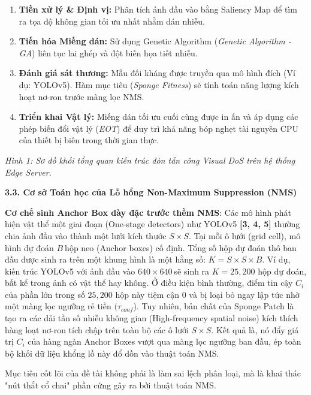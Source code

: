 \begin{enumerate}
\def\labelenumi{\arabic{enumi}.}
\item
  \textbf{Tiền xử lý \& Định vị:} Phân tích ảnh đầu vào bằng Saliency
  Map để tìm ra tọa độ không gian tối ưu nhất nhằm dán nhiễu.
\item
  \textbf{Tiến hóa Miếng dán:} Sử dụng Genetic Algorithm (\emph{Genetic
  Algorithm - GA}) liên tục lai ghép và đột biến họa tiết nhiễu.
\item
  \textbf{Đánh giá sát thương:} Mẫu đối kháng được truyền qua mô hình
  đích (Ví dụ: YOLOv5). Hàm mục tiêu (\emph{Sponge Fitness}) sẽ tính
  toán năng lượng kích hoạt nơ-ron trước màng lọc NMS.
\item
  \textbf{Triển khai Vật lý:} Miếng dán tối ưu cuối cùng được in ấn và
  áp dụng các phép biến đổi vật lý (\emph{EOT}) để duy trì khả năng bóp
  nghẹt tài nguyên CPU của thiết bị biên trong thời gian thực.
\end{enumerate}



\emph{Hình 1: Sơ đồ khối tổng quan kiến trúc đòn tấn công Visual DoS
trên hệ thống Edge Server.}

\textbf{3.3. Cơ sở Toán học của Lỗ hổng Non-Maximum Suppression (NMS)}

\textbf{Cơ chế sinh Anchor Box dày đặc trước thềm NMS}: Các mô hình phát
hiện vật thể một giai đoạn (One-stage detectors) như YOLOv5
\textbf{{[}3, 4, 5{]}} thường chia ảnh đầu vào thành một lưới kích thước
\(S \times S\). Tại mỗi ô lưới (grid cell), mô hình dự đoán \(B\ \)hộp
neo (Anchor boxes) cố định. Tổng số hộp dự đoán thô ban đầu được sinh ra
trên một khung hình là một hằng số: \(K = S \times S \times B\). Ví dụ,
kiến trúc YOLOv5 với ảnh đầu vào \(640 \times 640\ \)sẽ sinh ra
\(K = 25,200\) hộp dự đoán, bất kể trong ảnh có vật thể hay không. Ở
điều kiện bình thường, điểm tin cậy \(C_{i}\) của phần lớn trong số
\(25,200\) hộp này tiệm cận \(0\) và bị loại bỏ ngay lập tức nhờ một
màng lọc ngưỡng rẻ tiền \((\tau_{conf}\)). Tuy nhiên, bản chất của
Sponge Patch là tạo ra các dải tần số nhiễu không gian (High-frequency
spatial noise) kích thích hàng loạt nơ-ron tích chập trên toàn bộ các ô
lưới \(S \times S\). Kết quả là, nó đẩy giá trị \(C_{i}\) của hàng ngàn
Anchor Boxes vượt qua màng lọc ngưỡng ban đầu, ép toàn bộ khối dữ liệu
khổng lồ này đổ dồn vào thuật toán NMS.

Mục tiêu cốt lõi của đề tài không phải là làm sai lệch phân loại, mà là
khai thác "nút thắt cổ chai" phần cứng gây ra bởi thuật toán NMS.

